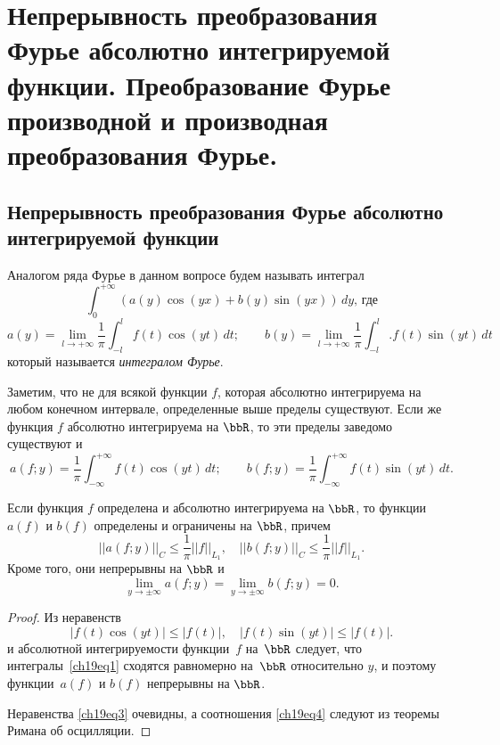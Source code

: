 \chapter{Непрерывность преобразования Фурье абсолютно интегрируемой функции. Преобразование Фурье производной и производная преобразования Фурье.}

\section{Непрерывность преобразования Фурье абсолютно интегрируемой функции}

Аналогом ряда Фурье в данном вопросе будем называть интеграл
$$
\int_{0}^{+\infty} (a(y)\cos(yx) + b(y)\sin(yx))\,dy,\, \text{где}
$$
$$
a(y) = \lim_{l \to +\infty}\frac{1}{\pi}\int_{-l}^{l} f(t)\cos(yt)\,dt;\qquad 
b(y) = \lim_{l \to +\infty}\frac{1}{\pi}\int_{-l}^{l}. f(t)\sin(yt)\,dt
$$
который называется \textit{интегралом Фурье}.

Заметим, что не для всякой функции $f$, которая абсолютно интегрируема на любом конечном интервале, определенные выше пределы существуют. Если же функция $f$ абсолютно интегрируема на $\bbR$, то эти пределы заведомо существуют и
\begin{equation} \label{ch19eq1}
a(f;y) = \frac{1}{\pi}\int_{-\infty}^{+\infty} f(t)\cos(yt)\,dt;
\qquad
b(f;y) = \frac{1}{\pi}\int_{-\infty}^{+\infty} f(t)\sin(yt)\,dt.
\end{equation}

\begin{thm}
Если функция $f$ определена и абсолютно интегрируема на $\bbR$, то функции $a(f)$ и $b(f)$ определены и ограничены на $\bbR$, причем
\begin{equation} \label{ch19eq3}
||a(f;y)||_C \le \frac{1}{\pi}||f||_{L_{1}}, \quad ||b(f;y)||_C \le \frac{1}{\pi}||f||_{L_{1}}.
\end{equation}
Кроме того, они непрерывны на $\bbR$ и
\begin{equation} \label{ch19eq4}
\lim_{y \to \pm\infty} a(f;y) = \lim_{y \to \pm\infty} b(f;y) = 0.
\end{equation}
\end{thm}
\begin{proof}
Из неравенств
$$
|f(t)\cos(yt)| \le |f(t)|, \quad |f(t)\sin(yt)| \le |f(t)|.
$$
и абсолютной интегрируемости функции~$f$ на~$\bbR$ следует, что интегралы~\eqref{ch19eq1} сходятся равномерно на~$\bbR$ относительно $y$, и поэтому функции~$a(f)$ и $b(f)$ непрерывны на $\bbR$.

Неравенства \eqref{ch19eq3} очевидны, а соотношения \eqref{ch19eq4} следуют из теоремы Римана об осцилляции. 
\end{proof}

